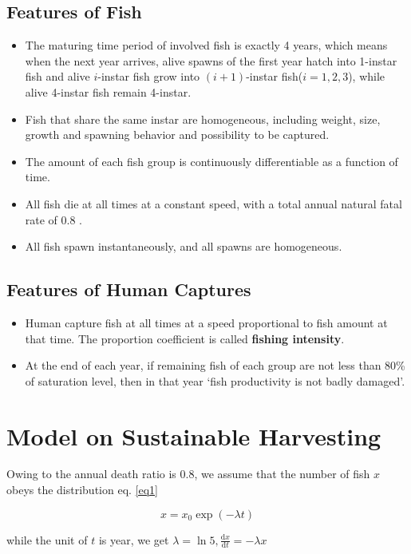 \documentclass{IEEEtran}
\begin{document}
\subsection{Features of Fish}
\begin{itemize}
\item {The maturing time period of involved fish is exactly 4 years, which means when the next year arrives, alive spawns of the first year hatch into 1-instar fish and alive $i$-instar fish grow into $(i+1)$-instar fish($i=1,2,3$), while alive 4-instar fish remain 4-instar.}
\item {Fish that share the same instar are homogeneous, including weight, size, growth and spawning behavior and possibility to be captured.}
\item {The amount of each fish group is continuously differentiable as a function of time.}
\item {All fish die at all times at a constant speed, with a total annual natural fatal rate of 0.8 .}
\item {All fish spawn instantaneously, and all spawns are homogeneous. }
\end{itemize}

\subsection{Features of Human Captures}
\begin{itemize}
\item {Human capture fish at all times at a speed proportional to fish amount at that time. The proportion coefficient is called \textbf{fishing intensity}.}
\item {At the end of each year, if remaining fish of each group are not less than 80\% of saturation level, then in that year `fish productivity is not badly damaged'.}
\end{itemize}
\section{Model on Sustainable Harvesting} \label{model1}
Owing to the annual death ratio is 0.8, we assume that the number of fish $x$ obeys the distribution eq. \ref{eq1}

\begin{equation}
    \label{eq1}
    x = x_0 \exp(-\lambda t)
\end{equation}

while the unit of $t$ is year, we get $\lambda = \ln 5, \frac{\mathrm dx}{\mathrm dt} = -\lambda x$
\end{document}
